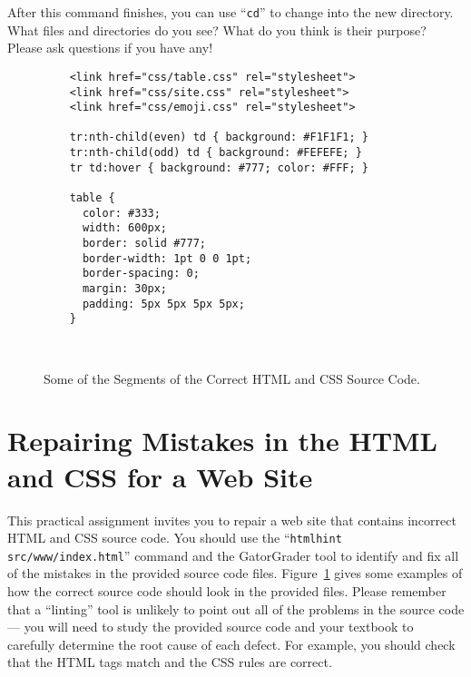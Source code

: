 \documentclass[11pt]{article}
\newcommand{\command}[1]{``\lstinline{#1}''}
\begin{document}
After this command finishes, you can use \command{cd} to change into the new directory. What files and directories do
you see? What do you think is their purpose? Please ask questions if you have any!

\begin{figure}[t]
  \centering

  \begin{verbatim}
    <link href="css/table.css" rel="stylesheet">
    <link href="css/site.css" rel="stylesheet">
    <link href="css/emoji.css" rel="stylesheet">

    tr:nth-child(even) td { background: #F1F1F1; }
    tr:nth-child(odd) td { background: #FEFEFE; }
    tr td:hover { background: #777; color: #FFF; }

    table {
      color: #333;
      width: 600px;
      border: solid #777;
      border-width: 1pt 0 0 1pt;
      border-spacing: 0;
      margin: 30px;
      padding: 5px 5px 5px 5px;
    }
  \end{verbatim}

  \vspace*{-3em}

  \caption{Some of the Segments of the Correct HTML and CSS Source Code.}~\label{fig:correct}

  \vspace*{-2em}

\end{figure}

\section*{Repairing Mistakes in the HTML and CSS for a Web Site}

This practical assignment invites you to repair a web site that contains
incorrect HTML and CSS source code. You should use the \command{htmlhint
src/www/index.html} command and the GatorGrader tool to identify and fix all of
the mistakes in the provided source code files. Figure~\ref{fig:correct} gives
some examples of how the correct source code should look in the provided files.
Please remember that a ``linting'' tool is unlikely to point out all of the
problems in the source code --- you will need to study the provided source code
and your textbook to carefully determine the root cause of each defect. For
example, you should check that the HTML tags match and the CSS rules are
correct.
\end{document}
